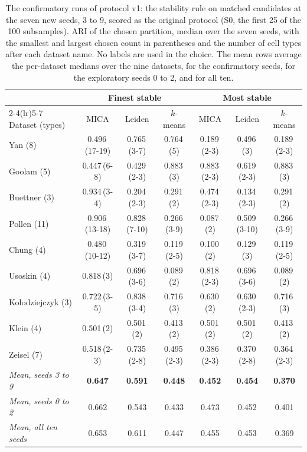 \begin{table}[t]
\centering
\caption{The confirmatory runs of protocol v1: the stability rule on matched candidates at the seven new seeds, 3 to 9, scored as the original protocol (S0, the first 25 of the 100 subsamples). ARI of the chosen partition, median over the seven seeds, with the smallest and largest chosen count in parentheses and the number of cell types after each dataset name. No labels are used in the choice. The mean rows average the per-dataset medians over the nine datasets, for the confirmatory seeds, for the exploratory seeds 0 to 2, and for all ten.}
\label{tab:confirm}
\footnotesize
\setlength{\tabcolsep}{4pt}
\begin{tabular}{lcccccc}
\toprule
 & \multicolumn{3}{c}{Finest stable} & \multicolumn{3}{c}{Most stable} \\
\cmidrule(lr){2-4}\cmidrule(lr){5-7}
Dataset (types) & MICA & Leiden & $k$-means & MICA & Leiden & $k$-means \\
\midrule
Yan (8) & 0.496\,(17\textrm{-}19) & 0.765\,(3\textrm{-}7) & 0.764\,(5) & 0.189\,(2\textrm{-}3) & 0.496\,(3) & 0.189\,(2\textrm{-}3) \\
Goolam (5) & 0.447\,(6\textrm{-}8) & 0.429\,(2\textrm{-}3) & 0.883\,(3) & 0.883\,(2\textrm{-}3) & 0.619\,(2\textrm{-}3) & 0.883\,(3) \\
Buettner (3) & 0.934\,(3\textrm{-}4) & 0.204\,(2\textrm{-}3) & 0.291\,(2) & 0.474\,(2\textrm{-}3) & 0.134\,(2\textrm{-}3) & 0.291\,(2) \\
Pollen (11) & 0.906\,(13\textrm{-}18) & 0.828\,(7\textrm{-}10) & 0.266\,(3\textrm{-}9) & 0.087\,(2) & 0.509\,(3\textrm{-}10) & 0.266\,(3\textrm{-}9) \\
Chung (4) & 0.480\,(10\textrm{-}12) & 0.319\,(3\textrm{-}7) & 0.119\,(2\textrm{-}5) & 0.100\,(2) & 0.129\,(3) & 0.119\,(2\textrm{-}5) \\
Usoskin (4) & 0.818\,(3) & 0.696\,(3\textrm{-}6) & 0.089\,(2) & 0.818\,(2\textrm{-}3) & 0.696\,(3\textrm{-}6) & 0.089\,(2) \\
Kolodziejczyk (3) & 0.722\,(3\textrm{-}5) & 0.838\,(3\textrm{-}4) & 0.716\,(3) & 0.630\,(2) & 0.630\,(2\textrm{-}3) & 0.716\,(3) \\
Klein (4) & 0.501\,(2) & 0.501\,(2) & 0.413\,(2) & 0.501\,(2) & 0.501\,(2) & 0.413\,(2) \\
Zeisel (7) & 0.518\,(2\textrm{-}3) & 0.735\,(2\textrm{-}8) & 0.495\,(2\textrm{-}3) & 0.386\,(2\textrm{-}3) & 0.370\,(2\textrm{-}8) & 0.364\,(2\textrm{-}3) \\
\midrule
\textit{Mean, seeds 3 to 9} & \textbf{0.647} & \textbf{0.591} & \textbf{0.448} & \textbf{0.452} & \textbf{0.454} & \textbf{0.370} \\
\textit{Mean, seeds 0 to 2} & 0.662 & 0.543 & 0.433 & 0.473 & 0.452 & 0.401 \\
\textit{Mean, all ten seeds} & 0.653 & 0.611 & 0.447 & 0.455 & 0.453 & 0.369 \\
\bottomrule
\end{tabular}
\end{table}
